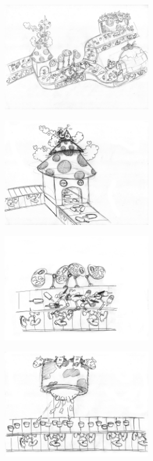 \documentclass[a4paper]{scrartcl}
\begin{document}
    \centering
    \begin{multicols}{2}
       \includegraphics[width=0.49\textwidth]{references/01}

       \includegraphics[width=0.49\textwidth]{references/02}
    \end{multicols}
    
    \begin{multicols}{2}
       \includegraphics[width=0.49\textwidth]{references/03}

       \includegraphics[width=0.49\textwidth]{references/04}
    \end{multicols}
    
\end{document}
